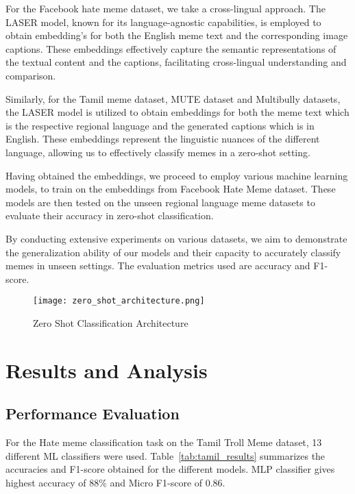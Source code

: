 \documentclass{ieeeaccess}
\begin{document}
For the Facebook hate meme dataset, we take a cross-lingual approach. The LASER model, known for its language-agnostic capabilities, is employed to obtain embedding's for both the English meme text and the corresponding image captions. These embeddings effectively capture the semantic representations of the textual content and the captions, facilitating cross-lingual understanding and comparison.

Similarly, for the Tamil meme dataset, MUTE dataset and Multibully datasets, the LASER model is utilized to obtain embeddings for both the meme text which is the respective regional language and the generated captions which is in English. These embeddings represent the linguistic nuances of the different language, allowing us to effectively classify memes in a zero-shot setting.

Having obtained the embeddings, we proceed to employ various machine learning models, to train on the embeddings from Facebook Hate Meme dataset. These models are then tested on the unseen regional language meme datasets to evaluate their accuracy in zero-shot classification.

By conducting extensive experiments on various datasets, we aim to demonstrate the generalization ability of our models and their capacity to accurately classify memes in unseen settings. The evaluation metrics used are accuracy and F1-score.

\begin{figure}[htbp]
\centering
\texttt{[image: zero\_shot\_architecture.png]}
\caption{Zero Shot Classification Architecture}
\label{fig:zero_shot}
\end{figure}






\section{Results and Analysis}
\label{sec:results}

\subsection{Performance Evaluation}
For the Hate meme classification task on the Tamil Troll Meme dataset, 13 different ML classifiers were used. Table~\ref{tab:tamil_results} summarizes the accuracies and F1-score obtained for the different models. MLP classifier gives highest accuracy of 88\% and Micro F1-score of 0.86.
\end{document}
